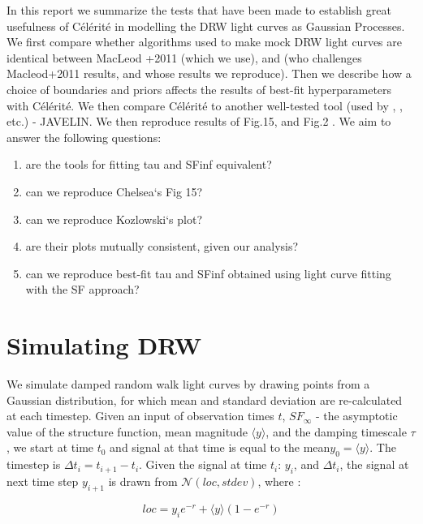 \documentclass[fleqn,usenatbib]{mnras}  %
\begin{document}
In this report we summarize the tests that have been made to establish great usefulness of  C\'el\'erit\'e in modelling the DRW light curves as Gaussian Processes. We  first compare whether algorithms used to make mock DRW light curves are identical between MacLeod +2011 (which we use), and \cite{kozlowski2017a} (who challenges Macleod+2011 results, and whose results we reproduce). Then we describe how  a choice of boundaries and priors affects the results of best-fit hyperparameters with  C\'el\'erit\'e.  We then compare C\'el\'erit\'e  to another well-tested tool (used by \cite{kozlowski2016a}, \cite{zu2011}, etc.) - JAVELIN.  We then reproduce results of \cite{macleod2011} Fig.15, and \cite{kozlowski2017a} Fig.2 .  	We aim to answer the following questions: 
\begin{enumerate}
\item are the tools for fitting tau and SFinf equivalent?
\item can we reproduce Chelsea`s Fig 15?
\item can we reproduce Kozlowski`s plot? 
\item are their plots mutually consistent, given our analysis? 
\item can we reproduce best-fit tau and SFinf obtained using light curve
     fitting with the SF approach? 
\end{enumerate}




\section{Simulating DRW}

We simulate damped random walk light curves by drawing  points from a Gaussian distribution, for which mean and standard deviation are re-calculated at each timestep. Given an input of observation times $t$,   $SF_{\infty}$ - the asymptotic value of the structure function, mean magnitude  $\langle y \rangle$, and the damping timescale $\tau$, we start at time $t_{0}$ and signal at that time is equal to the mean$y_{0} = \langle y \rangle$. The timestep is   
$\Delta t_{i} = t_{i+1} - t_{i}$.  Given  the signal at time $t_{i}$: $y_{i}$,  and $\Delta t_{i}$,  the signal at next time step $y_{i+1}$ is drawn from  $\mathcal{N}(loc, stdev)$, where : 

\begin{equation}
loc = y_{i} e ^ { - r  }  + \langle y \rangle \left( 1 - e ^{ - r }\right)
\end{equation}
\end{document}
